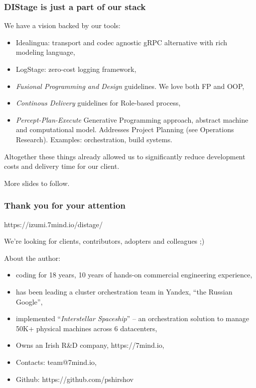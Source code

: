 \documentclass[usenames,dvipsnames]{beamer}
\begin{document}
\begin{frame}
\frametitle{DIStage is just a part of our stack}
We have a vision backed by our tools:
\begin{itemize}
\item Idealingua: transport and codec agnostic gRPC alternative with rich modeling language,
\item LogStage: zero-cost logging framework,
\item \textit{Fusional Programming and Design} guidelines. We love both FP and OOP,
\item \textit{Continous Delivery} guidelines for Role-based process, 
\item \textit{Percept-Plan-Execute} Generative Programming approach, abstract machine and computational model.
Addresses Project Planning (see Operations Research). Examples: orchestration, build systems.
\end{itemize}

Altogether these things already allowed us to significantly reduce development costs and
delivery time for our client.\newline

More slides to follow.
\end{frame}

\begin{frame}
    \frametitle{Thank you for your attention}

    \begin{center}
      https://izumi.7mind.io/distage/

      We're looking for clients, contributors, adopters and colleagues ;)
    \end{center}

    About the author:
    \begin{itemize}
        \item coding for 18 years, 10 years of hands-on commercial engineering experience,
        \item has been leading a cluster orchestration team in Yandex, ``the Russian Google'',
        \item implemented ``\textit{Interstellar Spaceship}'' -- an orchestration solution to manage 50K+ physical machines across 6 datacenters,
        \item Owns an Irish R\&D company, https://7mind.io,
        \item Contacts: team@7mind.io,
        \item Github: https://github.com/pshirshov
    \end{itemize}
\end{frame}
\end{document}
